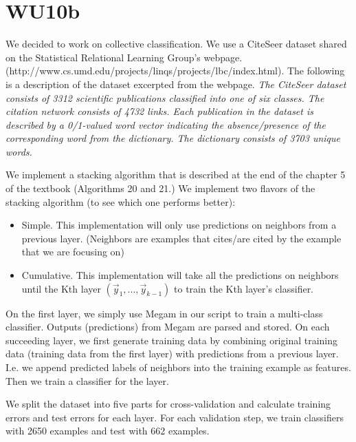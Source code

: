 \newpage
\section{WU10b}
We decided to work on collective classification. We use a CiteSeer dataset shared on the Statistical Relational Learning Group's webpage. (http://www.cs.umd.edu/projects/linqs/projects/lbc/index.html). The following is a description of the dataset excerpted from the webpage. \textit{The CiteSeer dataset consists of 3312 scientific publications classified into one of six classes. The citation network consists of 4732 links. Each publication in the dataset is described by a 0/1-valued word vector indicating the absence/presence of the corresponding word from the dictionary. The dictionary consists of 3703 unique words.}

We implement a stacking algorithm that is described at the end of the chapter 5 of the textbook (Algorithms 20 and 21.) We implement two flavors of the stacking algorithm (to see which one performs better):

\begin{itemize}
	\item Simple. This implementation will only use predictions on neighbors from a previous layer. (Neighbors are examples that cites/are cited by the example that we are focusing on)
	\item Cumulative. This implementation will take all the predictions on neighbors until the Kth layer $(\vec y_1, ..., \vec y_{k-1})$ to train the Kth layer's classifier.
\end{itemize}

On the first layer, we simply use Megam in our script to train a multi-class classifier. Outputs (predictions) from Megam are parsed and stored. On each succeeding layer, we first generate training data by combining original training data (training data from the first layer) with predictions from a previous layer. I.e. we append predicted labels of neighbors into the training example as features. Then we train a classifier for the layer.

We split the dataset into five parts for cross-validation and calculate training errors and test errors for each layer. For each validation step, we train classifiers with 2650 examples and test with 662 examples. 

